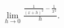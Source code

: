 \label{problemlim_hto0_(1/(x+h)^2-1/x^2)/h} $\displaystyle\lim\limits_{h\to 0}\frac{\frac{1}{(x+h)^2}-\frac{1}{x^2}}{h} $.

